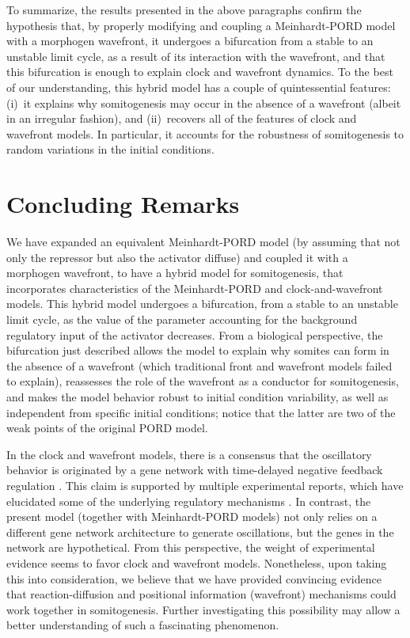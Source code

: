 \documentclass[%
 preprint,
 aip, 
 amsmath,amssymb,
]{revtex4-2}
\begin{document}
To summarize, the results presented in the above paragraphs confirm the hypothesis that, by properly modifying and coupling a Meinhardt-PORD model with a morphogen wavefront, it undergoes a bifurcation from a stable to an unstable limit cycle, as a result of its interaction with the wavefront, and that this bifurcation is enough to explain clock and wavefront dynamics. To the best of our understanding, this hybrid model has a couple of quintessential features: (i)~it explains why somitogenesis may occur in the absence of a wavefront (albeit in an irregular fashion), and (ii)~recovers all of the features of clock and wavefront models. In particular, it accounts for the robustness of somitogenesis to random variations in the initial conditions.
	
	
	\section{Concluding Remarks}
	\label{conclu}
	
We have expanded an equivalent Meinhardt-PORD model (by assuming that not only the repressor but also the activator diffuse) and coupled it with a morphogen wavefront, to have a hybrid model for somitogenesis, that incorporates characteristics of the Meinhardt-PORD and clock-and-wavefront models.  This hybrid model undergoes a bifurcation, from a stable to an unstable limit cycle, as the value of the parameter accounting for the background regulatory input of the activator decreases. From a biological perspective, the bifurcation just described allows the model to explain why somites can form in the absence of a wavefront (which traditional front and wavefront models failed to explain), reassesses the role of the wavefront as a conductor for somitogenesis, and makes the model behavior robust to initial condition variability, as well as independent from specific initial conditions; notice that the latter are two of the weak points of the original PORD model. 
	
	In the clock and wavefront models, there is a consensus that the oscillatory behavior is originated by a gene network with time-delayed negative feedback regulation \cite{Monk2003, Lewis2003}. This claim is supported by multiple experimental reports, which have elucidated some of the underlying regulatory mechanisms \cite{Schroter2012}. In contrast, the present model (together with Meinhardt-PORD models) not only relies on a different gene network architecture to generate oscillations, but the genes in the network are hypothetical. From this perspective, the weight of experimental evidence seems to favor clock and wavefront models. Nonetheless, upon taking this into consideration, we believe that we have provided convincing evidence that reaction-diffusion and positional information (wavefront) mechanisms could work together in somitogenesis. Further investigating this possibility may allow a better understanding of such a fascinating phenomenon.
	
\end{document}
